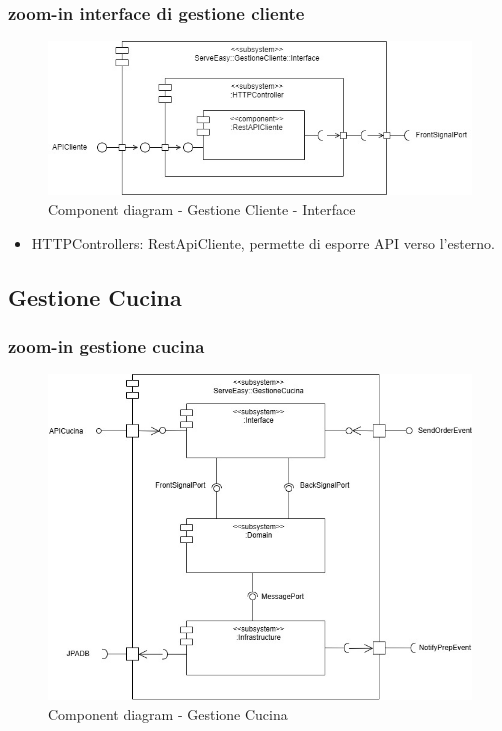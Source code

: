 \subsubsection{zoom-in interface di gestione cliente}
\begin{figure}[H]
	\centering
	\includegraphics[scale=0.5]{iterazione1/images/GestioneCliente_subsystem-Interface.jpg}
	\caption{Component diagram - Gestione Cliente - Interface \label{fig:component_diagram_gestione_cliente_interface}}
\end{figure}
\begin{itemize}
    \item HTTPControllers: RestApiCliente, permette di esporre API verso l'esterno.
\end{itemize}

\subsection{Gestione Cucina}
\subsubsection{zoom-in gestione cucina}
\begin{figure}[H]
	\centering
	\includegraphics[scale=0.5]{iterazione1/images/component_comanda_cucina-GestioneCucina.jpg}
	\caption{Component diagram - Gestione Cucina \label{fig:component_diagram_gestione_cucina}}
\end{figure}

